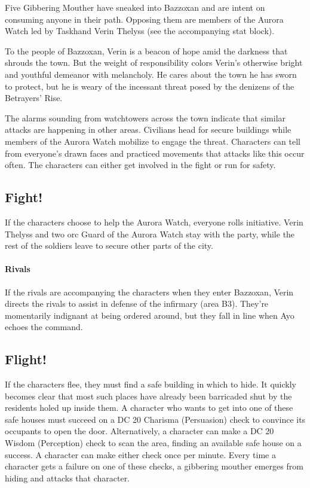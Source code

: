 \documentclass[10pt,a4paper,twoside,bg=print,twocolumn,openany,nodeprecatedcode]{dndbook}
\begin{document}
Five Gibbering Mouther have sneaked into Bazzoxan and are intent on consuming anyone in their path. Opposing them are members of the Aurora Watch led by Taskhand Verin Thelyss (see the accompanying stat block).

To the people of Bazzoxan, Verin is a beacon of hope amid the darkness that shrouds the town. But the weight of responsibility colors Verin's otherwise bright and youthful demeanor with melancholy. He cares about the town he has sworn to protect, but he is weary of the incessant threat posed by the denizens of the Betrayers' Rise.

The alarms sounding from watchtowers across the town indicate that similar attacks are happening in other areas. Civilians head for secure buildings while members of the Aurora Watch mobilize to engage the threat. Characters can tell from everyone's drawn faces and practiced movements that attacks like this occur often. The characters can either get involved in the fight or run for safety.


\subsection{Fight!}
If the characters choose to help the Aurora Watch, everyone rolls initiative. Verin Thelyss and two orc Guard of the Aurora Watch stay with the party, while the rest of the soldiers leave to secure other parts of the city.

\paragraph{Rivals}
If the rivals are accompanying the characters when they enter Bazzoxan, Verin directs the rivals to assist in defense of the infirmary (area B3). They're momentarily indignant at being ordered around, but they fall in line when Ayo echoes the command.

\subsection{Flight!}
If the characters flee, they must find a safe building in which to hide. It quickly becomes clear that most such places have already been barricaded shut by the residents holed up inside them. A character who wants to get into one of these safe houses must succeed on a DC 20 Charisma (Persuasion) check to convince its occupants to open the door. Alternatively, a character can make a DC 20 Wisdom (Perception) check to scan the area, finding an available safe house on a success. A character can make either check once per minute. Every time a character gets a failure on one of these checks, a gibbering mouther emerges from hiding and attacks that character.
\end{document}
